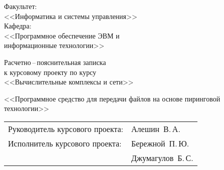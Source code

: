 \thispagestyle{fancy}


\vspace*{1cm}

\begin{flushright}
	\Large{ Факультет: }\\
	\large{ <<Информатика и системы управления>> }\\
	\Large{ Кафедра: }\\
	\large{ <<Программное обеспечение ЭВМ и\\ 
		информационные технологии>> }
\end{flushright}

\vspace{1cm}

\begin{LARGE} 
	\begin{center} 
        \begin{Large}
            Расчетно\,--\,пояснительная записка\\
            к курсовому проекту по курсу\\
            <<Вычислительные комплексы и сети>>\\
        \end{Large}
		\vspace{2cm}
        <<Программное средство для передачи файлов на основе пиринговой технологии>>
	\end{center}
\end{LARGE}

\vspace{4cm}

\begin{flushright}
	\begin{tabular}{ll}
	Руководитель курсового проекта:&Алешин~В.\,А.\\
	Исполнитель курсового проекта:&Бережной~П.\,Ю.\\
                                  &Джумагулов~Б.\,С.
	\end{tabular}
\end{flushright}

\newpage
\setcounter{page}{1}
